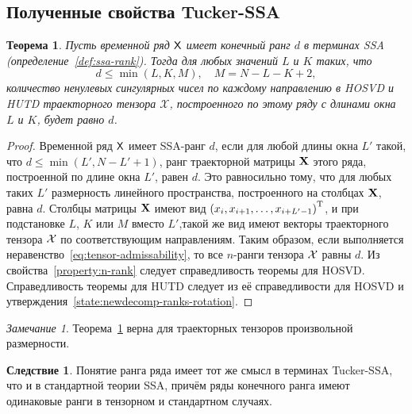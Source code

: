 \documentclass[specialist,
  substylefile = spbu.rtx,
subf,href,colorlinks=true, 12pt]{disser}
\theoremstyle{plain}
\newtheorem{theorem}{Теорема}[section]
\theoremstyle{definition}
\newtheorem*{corollary}{Следствие}
\theoremstyle{remark}
\newtheorem{remark}{Замечание}[section]
\def\newdecomp/{HUTD}
\def\tssa/{Tucker-SSA}
\begin{document}
\subsection{Полученные свойства \tssa/}
\begin{theorem}
  \label{theorem:tens-ssa-rank}
  Пусть временной ряд $\mathsf{X}$ имеет конечный ранг $d$ в терминах
  \emph{SSA} (определение~\ref{def:ssa-rank}).
  Тогда для любых значений $L$ и $K$ таких, что
  \begin{equation}
    d\leqslant\min(L, K, M), \quad M = N - L - K + 2,
    \label{eq:tensor-admissability}
  \end{equation}
  количество ненулевых сингулярных чисел по каждому направлению в
  HOSVD и HUTD траекторного тензора $\mathcal{X}$,
  построенного по этому ряду с длинами окна $L$ и $K$, будет равно $d$.
\end{theorem}
\begin{proof}
  Временной ряд $\mathsf{X}$ имеет SSA-ранг $d$, если для любой длины окна
  $L'$ такой, что $d \leqslant \min(L', N-L'+1)$, ранг траекторной
  матрицы $\mathbf{X}$ этого ряда, построенной по длине
  окна $L'$, равен $d$. Это равносильно тому, что для любых таких
  $L'$ размерность линейного пространства, построенного на столбцах
  $\mathbf{X}$, равна $d$. Столбцы матрицы $\mathbf{X}$ имеют вид $\left(x_i,
  x_{i+1}, \ldots, x_{i + L' - 1}\right)^{\mathrm{T}}$, и при подстановке
  $L$, $K$ или $M$ вместо $L'$,такой же вид имеют векторы
  траекторного тензора $\mathcal{X}$ по соответствующим направлениям. Таким
  образом, если выполняется
  неравенство~\eqref{eq:tensor-admissability}, то все $n$-ранги тензора
  $\mathcal{X}$ равны $d$. Из свойства~\ref{property:n-rank} следует
  справедливость теоремы для HOSVD. Справедливость теоремы для
  \newdecomp/ следует из её справедливости для HOSVD и
  утверждения~\ref{state:newdecomp-ranks-rotation}.
\end{proof}
\begin{remark}
  Теорема~\ref{theorem:tens-ssa-rank} верна для траекторных тензоров
  произвольной размерности.
\end{remark}
\begin{corollary}
  Понятие ранга ряда имеет тот же смысл в терминах \tssa/, что и в
  стандартной теории SSA, причём ряды
  конечного ранга имеют одинаковые ранги в тензорном и стандартном случаях.
\end{corollary}
\end{document}
